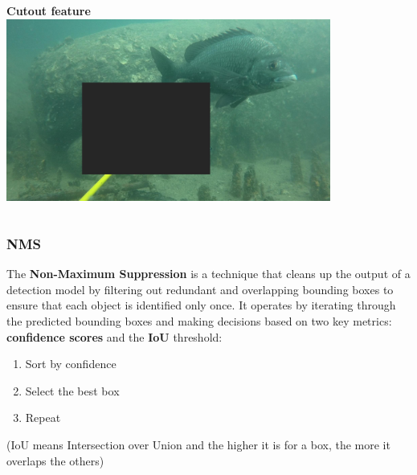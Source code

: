\documentclass[serif]{beamer}  %
\begin{document}
\begin{frame}
\begin{columns}
\begin{column}{0.5\textwidth}
	\centering
	\textbf{Cutout feature}
	\includegraphics[width=0.8\textwidth]{images/cutout.jpg}
\end{column}
\end{columns}

\end{frame}

\begin{frame}
\frametitle{NMS}
The \textbf{Non-Maximum Suppression} is a technique that cleans up the output of a detection model by filtering out redundant and overlapping bounding boxes to ensure that each object is identified only once. It operates by iterating through the predicted bounding boxes and making decisions based on two key metrics: \textbf{confidence scores} and the \textbf{IoU} threshold:
\begin{enumerate}
	\item Sort by confidence 
	\item Select the best box
	\item Repeat
\end{enumerate}
(IoU means Intersection over Union and the higher it is for a box, the more it overlaps the others)
\end{frame}
\end{document}
